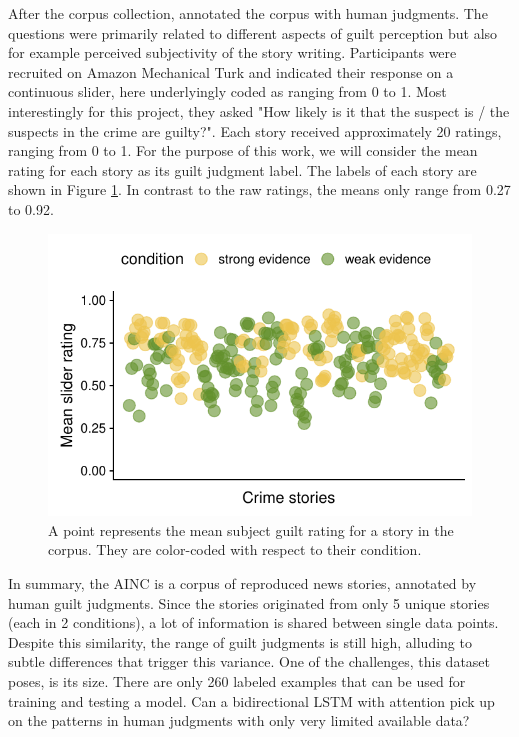 \documentclass[11pt,a4paper]{article}
\begin{document}
After the corpus collection, \citeauthor{Kreiss:2019} annotated the corpus with human judgments. The questions were primarily related to different aspects of guilt perception but also for example perceived subjectivity of the story writing. Participants were recruited on Amazon Mechanical Turk and indicated their response on a continuous slider, here underlyingly coded as ranging from 0 to 1. Most interestingly for this project, they asked "How likely is it that the suspect is / the suspects in the crime are guilty?". Each story received approximately 20 ratings, ranging from 0 to 1. For the purpose of this work, we will consider the mean rating for each story as its guilt judgment label. The labels of each story are shown in Figure \ref{fig:corpus-annotations}. In contrast to the raw ratings, the means only range from 0.27 to 0.92. 


\begin{figure}[t!]
	\includegraphics[width=\linewidth]{graphs/subjguilt.pdf}
	\caption{A point represents the mean subject guilt rating for a story in the corpus. They are color-coded with respect to their condition.}
	\label{fig:corpus-annotations}
\end{figure}

In summary, the AINC is a corpus of reproduced news stories, annotated by human guilt judgments. Since the stories originated from only 5 unique stories (each in 2 conditions), a lot of information is shared between single data points.  Despite this similarity, the range of guilt judgments is still high, alluding to subtle differences that trigger this variance. 
One of the challenges, this dataset poses, is its size. There are only 260 labeled examples that can be used for training and testing a model.
Can a bidirectional LSTM with attention pick up on the patterns in human judgments with only very limited available data?
\end{document}
